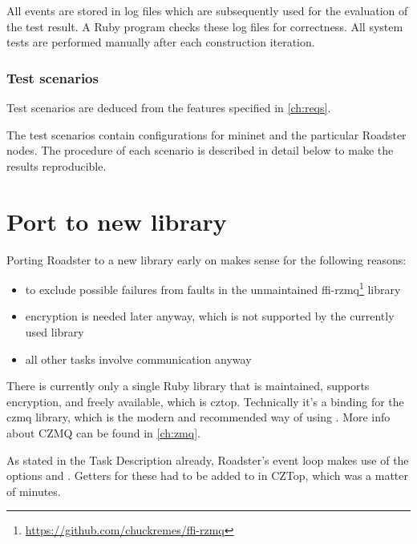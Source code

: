 All events are stored in log files which are subsequently used for the
evaluation of the test result.  A Ruby program checks these log files for
correctness. All system tests are performed manually after each construction
iteration.

\subsubsection{Test scenarios}
Test scenarios are deduced from the features specified in \autoref{ch:reqs}.

The test scenarios contain configurations for mininet and the particular Roadster nodes.
The procedure of each scenario is described in detail below to make the results reproducible.


\section{Port to new \zmq library}\label{sec:approach:port}
Porting Roadster to a new \zmq library early on makes sense for the following reasons:

\begin{itemize}
\item to exclude possible failures from faults in the unmaintained ffi-rzmq\footnote{\url{https://github.com/chuckremes/ffi-rzmq}} library
\item encryption is needed later anyway, which is not supported by the currently used library
\item all other tasks involve \zmq communication anyway
\end{itemize}

There is currently only a single Ruby library that is maintained, supports
encryption, and freely available, which is \gls{cztop}. Technically it's a
binding for the \gls{czmq} library, which is the modern and recommended way of
using \zmq. More info about CZMQ can be found in \autoref{ch:zmq}.

As stated in the Task Description already, Roadster's event loop makes use of
the \zmq options  and . Getters for these had to be
added to in CZTop, which was a matter of minutes.

